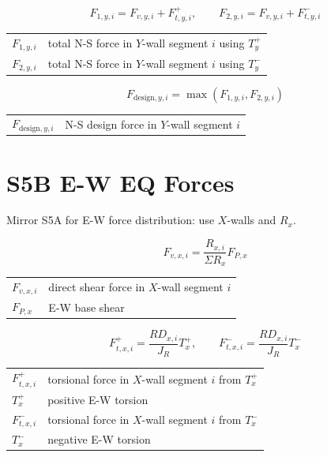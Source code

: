 \documentclass[10pt]{article}
\begin{document}
\begin{equation}
F_{1,y,i}=F_{v,y,i}+F_{t,y,i}^{+}, \qquad
F_{2,y,i}=F_{v,y,i}+F_{t,y,i}^{-}
\end{equation}

{\ttfamily\footnotesize
\begin{tabular}{@{}ll@{}}
$F_{1,y,i}$ & total N-S force in $Y$-wall segment $i$ using $T_y^+$ \\
$F_{2,y,i}$ & total N-S force in $Y$-wall segment $i$ using $T_y^-$ \\
\end{tabular}
}

\begin{equation}
F_{\text{design},y,i}=\max(F_{1,y,i},F_{2,y,i})
\end{equation}

{\ttfamily\footnotesize
\begin{tabular}{@{}ll@{}}
$F_{\text{design},y,i}$ & N-S design force in $Y$-wall segment $i$ \\
\end{tabular}
}

\section{S5B E-W EQ Forces}

Mirror S5A for E-W force distribution: use $X$-walls and $R_x$.

\begin{equation}
F_{v,x,i}=\frac{R_{x,i}}{\Sigma R_x}F_{P,x}
\end{equation}

{\ttfamily\footnotesize
\begin{tabular}{@{}ll@{}}
$F_{v,x,i}$ & direct shear force in $X$-wall segment $i$ \\
$F_{P,x}$ & E-W base shear \\
\end{tabular}
}

\begin{equation}
F_{t,x,i}^{+}=\frac{RD_{x,i}}{J_R}T_x^+, \qquad
F_{t,x,i}^{-}=\frac{RD_{x,i}}{J_R}T_x^-
\end{equation}

{\ttfamily\footnotesize
\begin{tabular}{@{}ll@{}}
$F_{t,x,i}^{+}$ & torsional force in $X$-wall segment $i$ from $T_x^+$ \\
$T_x^+$ & positive E-W torsion \\
$F_{t,x,i}^{-}$ & torsional force in $X$-wall segment $i$ from $T_x^-$ \\
$T_x^-$ & negative E-W torsion \\
\end{tabular}
}
\end{document}
